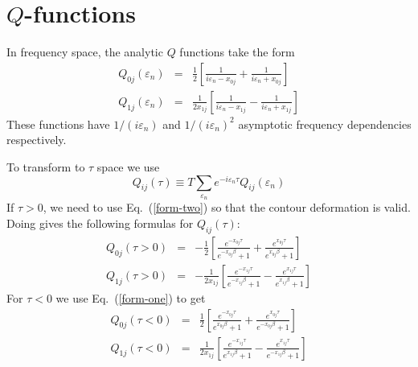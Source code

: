 \section{$Q$-functions}

In frequency space, the analytic $Q$ functions take the
form
\begin{eqnarray}
Q_{0j}(\varepsilon_n) & = & \frac{1}{2}
\left[ \frac{1}{i\varepsilon_n - x_{0j}}
 + \frac{1}{i\varepsilon_n + x_{0j}} \right] \\
Q_{1j}(\varepsilon_n) & = & 
\frac{1}{2x_{1j}}\left[ \frac{1}{i\varepsilon_n - x_{1j}}
 - \frac{1}{i\varepsilon_n + x_{1j}} \right]
\end{eqnarray}
These functions have $1 /(i \varepsilon_n)$ and
$1/(i\varepsilon_n)^2$ asymptotic frequency dependencies respectively.

To transform to $\tau$ space we use
\begin{equation}
Q_{ij}(\tau) \equiv T \sum_{\varepsilon_n} e^{-i \varepsilon_n \tau} 
Q_{ij}(\varepsilon_n)
\end{equation}
If $\tau > 0$, we need to use Eq.~(\ref{form-two}) so that
the contour deformation is valid.
Doing gives the following formulas for $Q_{ij}(\tau)$:
\begin{eqnarray}
Q_{0j}(\tau > 0) & = & -\frac{1}{2} \left[
\frac{e^{-x_{0j} \tau}}
{e^{-x_{0j} \beta} + 1} + \frac{e^{x_{0j} \tau}}{e^{x_{0j} \beta} + 1} 
\right] \\
Q_{1j}(\tau > 0) & = & -\frac{1}{2 x_{1j}}
\left [\frac{e^{-x_{1j} \tau}}
{e^{-x_{1j} \beta} + 1} -  \frac{e^{x_{1j} \tau}}
{e^{x_{1j} \beta} + 1} \right]
\end{eqnarray}
For $\tau < 0$ we use Eq.~(\ref{form-one}) to get
\begin{eqnarray}
Q_{0j}(\tau < 0) & = & \frac{1}{2} \left[
\frac{e^{-x_{0j} \tau}}{e^{x_{0j} \beta} + 1} +
\frac{e^{x_{0j} \tau}}{e^{-x_{0j} \beta} + 1} \right] \\
Q_{1j}(\tau < 0) & = & \frac{1}{2x_{1j}} \left[
\frac{e^{-x_{1j} \tau}}{e^{x_{1j} \beta} + 1} -
\frac{e^{x_{1j} \tau}}{e^{-x_{1j} \beta} + 1} \right] 
\end{eqnarray}


